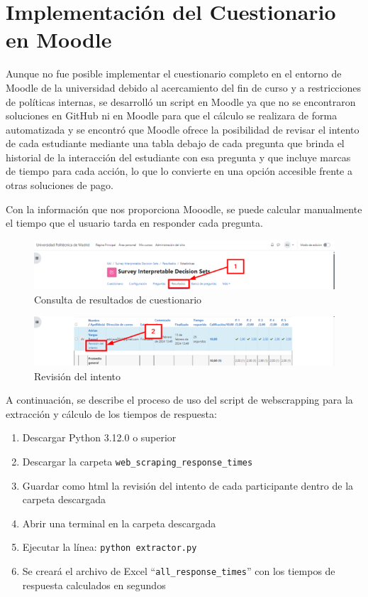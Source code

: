 \section{Implementación del Cuestionario en Moodle}

Aunque no fue posible implementar el cuestionario completo en el entorno de Moodle de la universidad debido al acercamiento del fin de curso y a restricciones de políticas internas, se desarrolló un script en Moodle ya que no se encontraron soluciones en GitHub ni en Moodle para que el cálculo se realizara de forma automatizada y se encontró que Moodle ofrece la posibilidad de revisar el intento de cada estudiante mediante una tabla debajo de cada pregunta que brinda el historial de la interacción del estudiante con esa pregunta y que incluye marcas de tiempo para cada acción, lo que lo convierte en una opción accesible frente a otras soluciones de pago. 

Con la información que nos proporciona Mooodle, se puede calcular manualmente el tiempo que el usuario tarda en responder cada pregunta.

\begin{figure}[h]
    \centering
    \includegraphics[width=0.9\linewidth]{include/moodle_step1.png}
    \caption{Consulta de resultados de cuestionario}
    \label{fig:nasa-tlx-propio}
\end{figure}

\begin{figure}[h]
    \centering
    \includegraphics[width=0.9\linewidth]{include/moodle_step2.png}
    \caption{Revisión del intento}
    \label{fig:nasa-tlx-propio_}
\end{figure}

A continuación, se describe el proceso de uso del script de webscrapping para la extracción y cálculo de los tiempos de respuesta:

\begin{enumerate}
    \item Descargar Python 3.12.0 o superior
    \item Descargar la carpeta \texttt{web\_scraping\_response\_times}
    \item Guardar como html la revisión del intento de cada participante dentro de la carpeta descargada
    \item Abrir una terminal en la carpeta descargada
    \item Ejecutar la línea: \texttt{python extractor.py}
    \item Se creará el archivo de Excel “\texttt{all\_response\_times}” con los tiempos de respuesta calculados en segundos
\end{enumerate}




